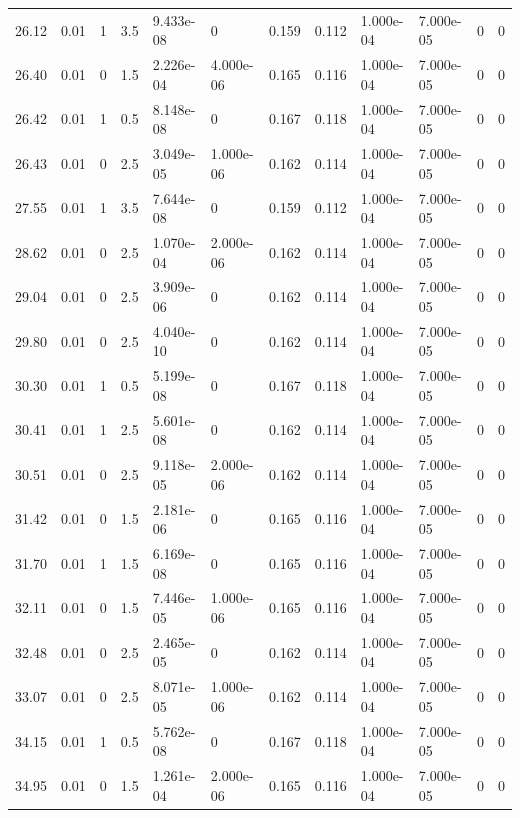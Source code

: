 \documentclass[preview]{standalone}
\begin{document}
{{{\begin{tabular}{L{1.2cm}C{1.2cm} C{0.3cm}C{0.5cm} C{1.4cm}C{1.4cm} C{1.4cm}C{1.4cm} C{1.6cm}C{1.6cm} C{1.6cm}C{1.6cm}}
  26.12  &  0.01  & 1     & 3.5 &  9.433e-08  & 0  &  0.159&   0.112& 1.000e-04 & 7.000e-05   &  0 & 0  \\ 
  26.40  &  0.01  & 0     & 1.5 &  2.226e-04  & 4.000e-06  &  0.165&   0.116& 1.000e-04 & 7.000e-05   &  0 & 0  \\ 
  26.42  &  0.01  & 1     & 0.5 &  8.148e-08  & 0  &  0.167&   0.118& 1.000e-04 & 7.000e-05   &  0 & 0  \\ 
  26.43  &  0.01  & 0     & 2.5 &  3.049e-05  & 1.000e-06  &  0.162&   0.114& 1.000e-04 & 7.000e-05   &  0 & 0  \\ 
  27.55  &  0.01  & 1     & 3.5 &  7.644e-08  & 0  &  0.159&   0.112& 1.000e-04 & 7.000e-05   &  0 & 0  \\ 
  28.62  &  0.01  & 0     & 2.5 &  1.070e-04  & 2.000e-06  &  0.162&   0.114& 1.000e-04 & 7.000e-05   &  0 & 0  \\ 
  29.04  &  0.01  & 0     & 2.5 &  3.909e-06  & 0  &  0.162&   0.114& 1.000e-04 & 7.000e-05   &  0 & 0  \\ 
  29.80  &  0.01  & 0     & 2.5 &  4.040e-10  & 0  &  0.162&   0.114& 1.000e-04 & 7.000e-05   &  0 & 0  \\ 
  30.30  &  0.01  & 1     & 0.5 &  5.199e-08  & 0  &  0.167&   0.118& 1.000e-04 & 7.000e-05   &  0 & 0  \\ 
  30.41  &  0.01  & 1     & 2.5 &  5.601e-08  & 0  &  0.162&   0.114& 1.000e-04 & 7.000e-05   &  0 & 0  \\ 
  30.51  &  0.01  & 0     & 2.5 &  9.118e-05  & 2.000e-06  &  0.162&   0.114& 1.000e-04 & 7.000e-05   &  0 & 0  \\ 
  31.42  &  0.01  & 0     & 1.5 &  2.181e-06  & 0  &  0.165&   0.116& 1.000e-04 & 7.000e-05   &  0 & 0  \\ 
  31.70  &  0.01  & 1     & 1.5 &  6.169e-08  & 0  &  0.165&   0.116& 1.000e-04 & 7.000e-05   &  0 & 0  \\ 
  32.11  &  0.01  & 0     & 1.5 &  7.446e-05  & 1.000e-06  &  0.165&   0.116& 1.000e-04 & 7.000e-05   &  0 & 0  \\ 
  32.48  &  0.01  & 0     & 2.5 &  2.465e-05  & 0  &  0.162&   0.114& 1.000e-04 & 7.000e-05   &  0 & 0  \\ 
  33.07  &  0.01  & 0     & 2.5 &  8.071e-05  & 1.000e-06  &  0.162&   0.114& 1.000e-04 & 7.000e-05   &  0 & 0  \\ 
  34.15  &  0.01  & 1     & 0.5 &  5.762e-08  & 0  &  0.167&   0.118& 1.000e-04 & 7.000e-05   &  0 & 0  \\ 
  34.95  &  0.01  & 0     & 1.5 &  1.261e-04  & 2.000e-06  &  0.165&   0.116& 1.000e-04 & 7.000e-05   &  0 & 0  \\ 

\end{tabular}}}}
\end{document}
